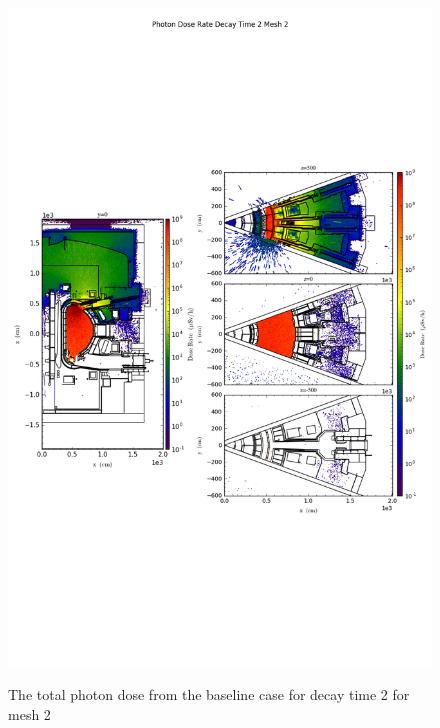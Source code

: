 \begin{figure}[ht!]
\centering
\includegraphics[trim={0cm 9cm 0cm 10cm},clip,scale=0.75]{../plots/final_model_nob4c/Photon_Dose_Rate_Decay_Time_2_Mesh_2.png}
\label{fig:photons_dc2_no4bc_m2_flux}
\caption{The total photon dose from the baseline case for decay time 2 for mesh 2}
\end{figure}
